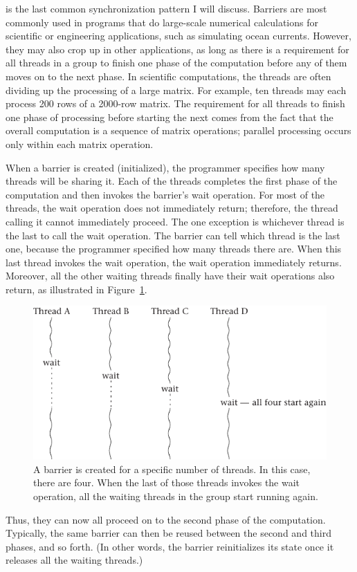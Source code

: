  is the last common synchronization pattern I
will discuss.  Barriers are most commonly used in programs that do
large-scale numerical calculations for scientific or engineering
applications, such as simulating ocean currents.  However, they may
also crop up in other applications, as long as there is a requirement
for all threads in a group to finish one phase of the computation
before any of them moves on to the next phase.  In scientific
computations, the threads are often dividing up the processing of a
large matrix.  For example, ten threads may each process 200 rows of a
2000-row matrix.  The requirement for all threads to finish one phase
of processing before starting the next comes from the fact that the
overall computation is a sequence of matrix operations; parallel
processing occurs only within each matrix operation.

When a barrier is created (initialized), the programmer specifies how
many threads will be sharing it.  Each of the threads completes the first
phase of the computation and then invokes the barrier's wait
operation.  For most of the threads, the wait operation does not
immediately return; therefore, the thread calling it cannot
immediately proceed.  The one exception is whichever thread is the
last to call the
wait operation.  The barrier can tell which thread is the last one,
because the programmer specified how many threads there are.  When this last
thread invokes the wait operation, the wait operation immediately
returns.  Moreover, all the other waiting threads finally have their
wait operations also return, as illustrated in Figure~\ref{scan-4-9}.
\begin{figure}
\centerline{\includegraphics{hail_f0416}}
\caption{A barrier is created for a specific number of threads.
In this case, there are
  four.  When the last of those threads invokes the wait operation,
  all the waiting threads in the group start running again.}
\label{scan-4-9}
\end{figure}
Thus, they can now all proceed on to the
second phase of the computation.  Typically, the same barrier can then
be reused between the second and third phases, and so forth.  (In other words,
the barrier reinitializes its state once it releases all the waiting
threads.)

